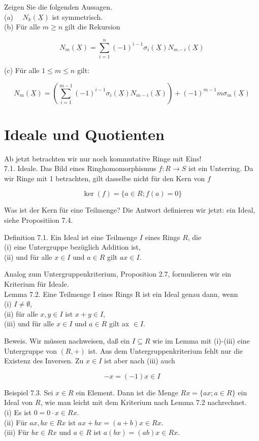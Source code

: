 \documentclass[10pt, letterpaper]{article}
\begin{document}
Zeigen Sie die folgenden Aussagen.\\
(a) $\quad N_{k}(\underline{X})$ ist symmetrisch.\\
(b) Für alle $m \geq n$ gilt die Rekursion

$$
N_{m}(\underline{X})=\sum_{i=1}^{n}(-1)^{i-1} \sigma_{i}(\underline{X}) N_{m-i}(\underline{X})
$$

(c) Für alle $1 \leq m \leq n$ gilt:

$$
N_{m}(\underline{X})=\left(\sum_{i=1}^{m-1}(-1)^{i-1} \sigma_{i}(\underline{X}) N_{m-i}(\underline{X})\right)+(-1)^{m-1} m \sigma_{m}(\underline{X})
$$

\section*{Ideale und Quotienten}
Ab jetzt betrachten wir nur noch kommutative Ringe mit Eins!\\
7.1. Ideale. Das Bild eines Ringhomomorphismus $f: R \rightarrow S$ ist ein Unterring. Da wir Ringe mit 1 betrachten, gilt dasselbe nicht für den Kern von $f$

$$
\operatorname{ker}(f)=\{a \in R ; f(a)=0\}
$$

Was ist der Kern für eine Teilmenge? Die Antwort definieren wir jetzt: ein Ideal, siehe Propositiion 7.4.

Definition 7.1. Ein Ideal ist eine Teilmenge $I$ eines Rings $R$, die\\
(i) eine Untergruppe bezüglich Addition ist,\\
(ii) und für alle $x \in I$ und $a \in R$ gilt $a x \in I$.

Analog zum Untergruppenkriterium, Proposition 2.7, formulieren wir ein Kriterium für Ideale.\\
Lemma 7.2. Eine Teilmenge I eines Rings R ist ein Ideal genau dann, wenn\\
(i) $I \neq \emptyset$,\\
(ii) für alle $x, y \in I$ ist $x+y \in I$,\\
(iii) und für alle $x \in I$ und $a \in R$ gilt ax $\in I$.

Beweis. Wir müssen nachweisen, daß ein $I \subseteq R$ wie im Lemma mit (i)-(iii) eine Untergruppe von $(R,+)$ ist. Aus dem Untergruppenkriterium fehlt nur die Existenz des Inversen. Zu $x \in I$ ist aber nach (iii) auch

$$
-x=(-1) x \in I
$$

Beispiel 7.3. Sei $x \in R$ ein Element. Dann ist die Menge $R x=\{a x ; a \in R\}$ ein Ideal von $R$, wie man leicht mit dem Kriterium nach Lemma 7.2 nachrechnet.\\
(i) Es ist $0=0 \cdot x \in R x$.\\
(ii) Für $a x, b x \in R x$ ist $a x+b x=(a+b) x \in R x$.\\
(iii) Für $b x \in R x$ und $a \in R$ ist $a(b x)=(a b) x \in R x$.
\end{document}
